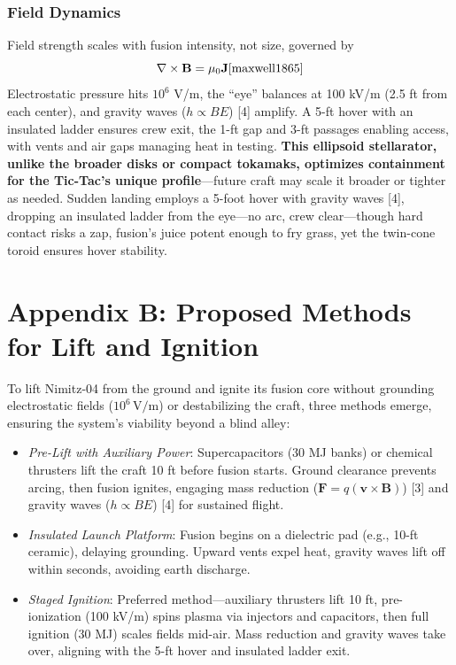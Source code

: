 \documentclass[11pt]{article}
\begin{document}
	\subsubsection{Field Dynamics}
	Field strength scales with fusion intensity, not size, governed by
	\begin{equation}
		\nabla \times \mathbf{B} = \mu_0 \mathbf{J} \cite{maxwell1865}
	\end{equation}
	Electrostatic pressure hits \(10^6\) V/m, the “eye” balances at 100 kV/m (2.5 ft from each center), and gravity waves (\( h \propto B E \)) [4] amplify. A 5-ft hover with an insulated ladder ensures crew exit, the 1-ft gap and 3-ft passages enabling access, with vents and air gaps managing heat in testing. \textbf{This ellipsoid stellarator, unlike the broader disks or compact tokamaks, optimizes containment for the Tic-Tac's unique profile}—future craft may scale it broader or tighter as needed. Sudden landing employs a 5-foot hover with gravity waves [4], dropping an insulated ladder from the eye—no arc, crew clear—though hard contact risks a zap, fusion’s juice potent enough to fry grass, yet the twin-cone toroid ensures hover stability.
	
	\newpage
	\section*{Appendix B: Proposed Methods for Lift and Ignition}
	To lift Nimitz-04 from the ground and ignite its fusion core without grounding electrostatic fields (\(10^6 \, \text{V/m}\)) or destabilizing the craft, three methods emerge, ensuring the system’s viability beyond a blind alley:
	
	\begin{itemize}
		\item \textit{Pre-Lift with Auxiliary Power}: Supercapacitors (30 MJ banks) or chemical thrusters lift the craft 10 ft before fusion starts. Ground clearance prevents arcing, then fusion ignites, engaging mass reduction (\(\mathbf{F} = q(\mathbf{v} \times \mathbf{B})\)) [3] and gravity waves (\(h \propto B E\)) [4] for sustained flight.
		\item \textit{Insulated Launch Platform}: Fusion begins on a dielectric pad (e.g., 10-ft ceramic), delaying grounding. Upward vents expel heat, gravity waves lift off within seconds, avoiding earth discharge.
		\item \textit{Staged Ignition}: Preferred method—auxiliary thrusters lift 10 ft, pre-ionization (100 kV/m) spins plasma via injectors and capacitors, then full ignition (30 MJ) scales fields mid-air. Mass reduction and gravity waves take over, aligning with the 5-ft hover and insulated ladder exit.
	\end{itemize}
	
\end{document}
